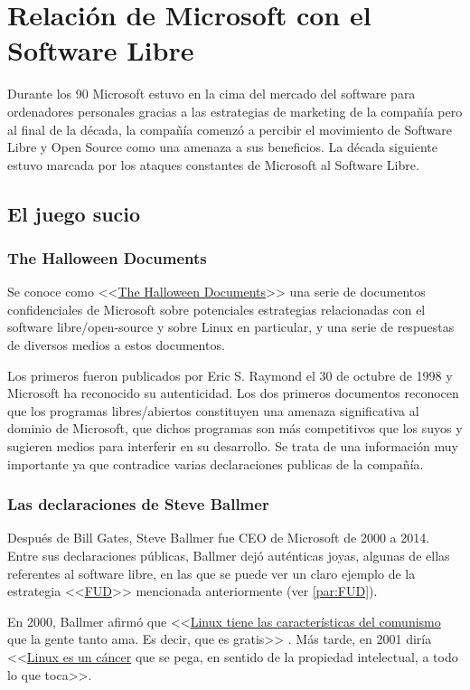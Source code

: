 \section{Relación de Microsoft con el Software Libre}
Durante los 90 Microsoft estuvo en la cima del mercado del software para ordenadores personales gracias a las estrategias de marketing de la compañía pero al final de la década, la compañía comenzó a percibir el movimiento de Software Libre y Open Source como una amenaza a sus beneficios. La década siguiente estuvo marcada por los ataques constantes de Microsoft al Software Libre.\cite{wiki_2020:microsoft_and_open_source}

\subsection{El juego sucio}
\subsubsection{The Halloween Documents}
Se conoce como <<\href{https://en.wikipedia.org/wiki/Halloween_documents}{The Halloween Documents}>> una serie de documentos confidenciales de Microsoft sobre potenciales estrategias relacionadas con el software libre/open-source y sobre Linux en particular, y una serie de respuestas de diversos medios a estos documentos.

Los primeros fueron publicados por Eric S. Raymond el 30 de octubre de 1998 y Microsoft ha reconocido su autenticidad. Los dos primeros documentos reconocen que los programas libres/abiertos constituyen una amenaza significativa al dominio de Microsoft, que dichos programas son más competitivos que los suyos y sugieren medios para interferir en su desarrollo. Se trata de una información muy importante ya que contradice varias declaraciones publicas de la compañía. \cite{wiki_2020:halloween_documents}

\subsubsection{Las declaraciones de Steve Ballmer}
Después de Bill Gates, Steve Ballmer fue CEO de Microsoft de 2000 a 2014. Entre sus declaraciones públicas, Ballmer dejó auténticas joyas, algunas de ellas referentes al software libre, en las que se puede ver un claro ejemplo de la estrategia <<\href{https://en.wikipedia.org/wiki/Fear,_uncertainty,_and_doubt}{FUD}>> mencionada anteriormente (ver \ref{par:FUD}).

En 2000, Ballmer afirmó que <<\href{https://www.theregister.co.uk/2000/07/31/ms_ballmer_linux_is_communism/}{Linux tiene las características del comunismo} que la gente tanto ama. Es decir, que es gratis>> \cite{lea_2000:ballmer_linux_comunism}. Más tarde, en 2001 diría <<\href{https://www.theregister.co.uk/2001/06/02/ballmer_linux_is_a_cancer/}{Linux es un cáncer} que se pega, en sentido de la propiedad intelectual, a todo lo que toca>>. \cite{greene_2018:ballmer_linux_cancer}

